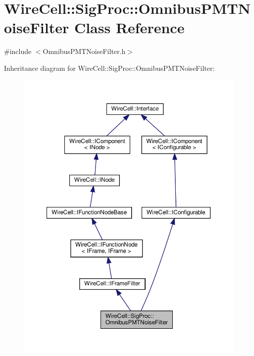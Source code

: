 \hypertarget{class_wire_cell_1_1_sig_proc_1_1_omnibus_p_m_t_noise_filter}{}\section{Wire\+Cell\+:\+:Sig\+Proc\+:\+:Omnibus\+P\+M\+T\+Noise\+Filter Class Reference}
\label{class_wire_cell_1_1_sig_proc_1_1_omnibus_p_m_t_noise_filter}


{\ttfamily \#include $<$Omnibus\+P\+M\+T\+Noise\+Filter.\+h$>$}



Inheritance diagram for Wire\+Cell\+:\+:Sig\+Proc\+:\+:Omnibus\+P\+M\+T\+Noise\+Filter\+:
\nopagebreak
\begin{figure}[H]
\begin{center}
\leavevmode
\includegraphics[width=350pt]{class_wire_cell_1_1_sig_proc_1_1_omnibus_p_m_t_noise_filter__inherit__graph}
\end{center}
\end{figure}


